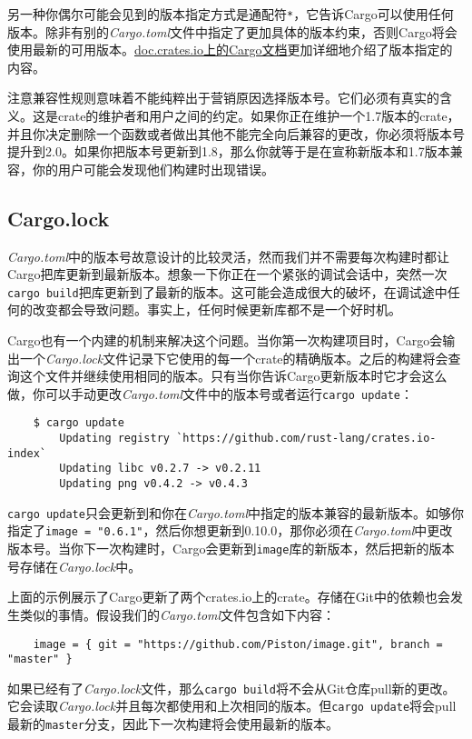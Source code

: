 另一种你偶尔可能会见到的版本指定方式是通配符\texttt{*}，它告诉Cargo可以使用任何版本。除非有别的\emph{Cargo.toml}文件中指定了更加具体的版本约束，否则Cargo将会使用最新的可用版本。\href{https://doc.rust-lang.org/cargo/reference/specifying-dependencies.html}{doc.crates.io上的Cargo文档}更加详细地介绍了版本指定的内容。

注意兼容性规则意味着不能纯粹出于营销原因选择版本号。它们必须有真实的含义。这是crate的维护者和用户之间的约定。如果你正在维护一个1.7版本的crate，并且你决定删除一个函数或者做出其他不能完全向后兼容的更改，你必须将版本号提升到2.0。如果你把版本号更新到1.8，那么你就等于是在宣称新版本和1.7版本兼容，你的用户可能会发现他们构建时出现错误。

\subsection{Cargo.lock}
\emph{Cargo.toml}中的版本号故意设计的比较灵活，然而我们并不需要每次构建时都让Cargo把库更新到最新版本。想象一下你正在一个紧张的调试会话中，突然一次\texttt{cargo build}把库更新到了最新的版本。这可能会造成很大的破坏，在调试途中任何的改变都会导致问题。事实上，任何时候更新库都不是一个好时机。

Cargo也有一个内建的机制来解决这个问题。当你第一次构建项目时，Cargo会输出一个\emph{Cargo.lock}文件记录下它使用的每一个crate的精确版本。之后的构建将会查询这个文件并继续使用相同的版本。只有当你告诉Cargo更新版本时它才会这么做，你可以手动更改\emph{Cargo.toml}文件中的版本号或者运行\texttt{cargo update}：
\begin{verbatim}
    $ cargo update
        Updating registry `https://github.com/rust-lang/crates.io-index`
        Updating libc v0.2.7 -> v0.2.11
        Updating png v0.4.2 -> v0.4.3
\end{verbatim}

\texttt{cargo update}只会更新到和你在\emph{Cargo.toml}中指定的版本兼容的最新版本。如够你指定了\texttt{image = "0.6.1"}，然后你想更新到0.10.0，那你必须在\emph{Cargo.toml}中更改版本号。当你下一次构建时，Cargo会更新到\texttt{image}库的新版本，然后把新的版本号存储在\emph{Cargo.lock}中。

上面的示例展示了Cargo更新了两个crates.io上的crate。存储在Git中的依赖也会发生类似的事情。假设我们的\emph{Cargo.toml}文件包含如下内容：
\begin{verbatim}
    image = { git = "https://github.com/Piston/image.git", branch = "master" }
\end{verbatim}

如果已经有了\emph{Cargo.lock}文件，那么\texttt{cargo build}将不会从Git仓库pull新的更改。它会读取\emph{Cargo.lock}并且每次都使用和上次相同的版本。但\texttt{cargo update}将会pull最新的\texttt{master}分支，因此下一次构建将会使用最新的版本。

